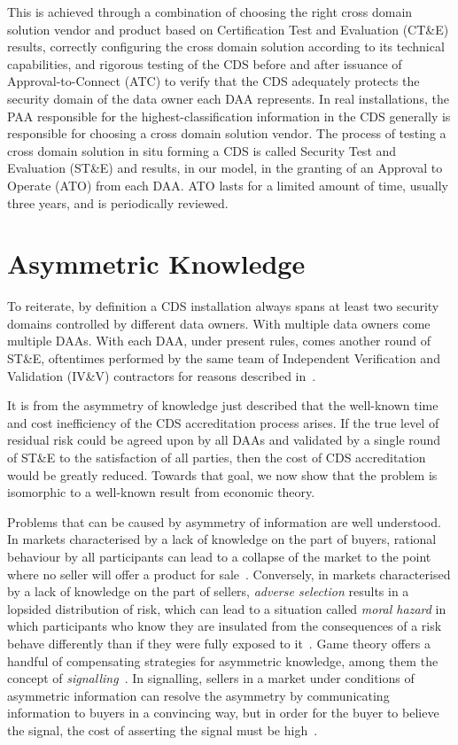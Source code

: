 \documentclass{llncs}
\begin{document}
This is
achieved through a combination of choosing the right cross domain solution vendor and product
based on Certification Test and Evaluation (CT\&E) results, correctly configuring
the cross domain solution according
to its technical capabilities, and rigorous testing of the CDS before and
after issuance of Approval-to-Connect (ATC) to verify that the CDS adequately protects
the security domain of the data owner each DAA represents.  In real installations,
the PAA responsible for the highest-classification information in the CDS generally is
responsible for choosing a cross domain solution vendor.  The process of testing a
cross domain solution in situ forming a CDS
is called Security Test and Evaluation (ST\&E) and results,
in our model, in the granting of an Approval
to Operate (ATO) from each DAA.  ATO lasts for a limited amount
of time, usually three years, and is periodically reviewed.

\section{Asymmetric Knowledge}

To reiterate, by definition a CDS installation always
spans at least two security domains controlled by different data owners.
With multiple data owners come multiple DAAs.  With each DAA, under present rules, comes
another round of ST\&E, oftentimes performed by the same team of Independent
Verification and Validation (IV\&V) contractors for reasons
described in~\cite{Loughry2010a}.

It is from the asymmetry of knowledge
just described that the well-known time and cost inefficiency of the CDS
accreditation process arises.
If the true level of residual risk could be agreed upon by all DAAs and
validated by a single round of ST\&E to the satisfaction of all parties,
then the cost of CDS accreditation would be greatly reduced.  Towards that goal,
we now show that the problem is isomorphic to a well-known result from economic
theory.

Problems that can be caused by asymmetry of information are well
understood.
In markets characterised by a lack of knowledge on the part of
buyers, rational behaviour by all participants can lead to a collapse
of the market to the point where no seller will offer a product for
sale~\cite{Akerlof1970}.
Conversely, in markets characterised by a lack of knowledge on the
part of sellers, \emph{adverse selection} results in a lopsided distribution
of risk, which can lead to a situation called \emph{moral hazard} in which
participants who know they are insulated from the consequences of a
risk behave differently than if they were fully exposed to it~\cite{Crosby1905}.
Game theory offers a handful of compensating strategies for asymmetric
knowledge, among them the concept
of \emph{signalling}~\cite{Spence1973,Stigler1961}.  In signalling,
sellers in a market under conditions of asymmetric information
can resolve the asymmetry by communicating information to buyers in a
convincing way, but in order for the buyer to believe the signal, the cost
of asserting the signal must be high~\cite{Spence1973}.
\end{document}
